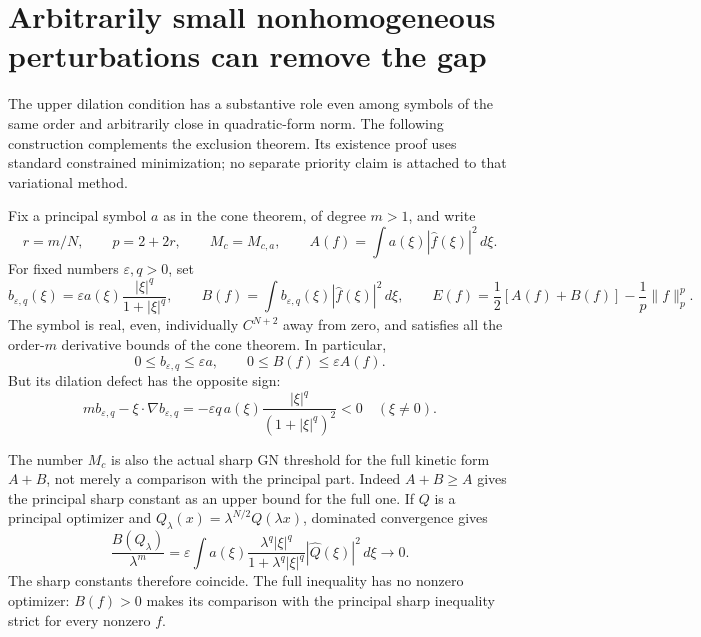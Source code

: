 \section{Arbitrarily small nonhomogeneous perturbations can remove the gap}
\label{sec:r9-bounded-boundary}

The upper dilation condition has a substantive role even among symbols
of the same order and arbitrarily close in quadratic-form norm. The
following construction complements the exclusion theorem. Its existence
proof uses standard constrained minimization; no separate priority claim
is attached to that variational method.

Fix a principal symbol $a$ as in the cone theorem, of degree $m>1$,
and write
\[
 r=m/N,\qquad p=2+2r,\qquad M_c=M_{c,a},\qquad
 A(f)=\int a(\xi)|\widehat f(\xi)|^2\,d\xi.
\]
For fixed numbers $\varepsilon,q>0$, set
\begin{equation}\label{eq:r9-bounded-symbol}
 b_{\varepsilon,q}(\xi)
 =\varepsilon a(\xi)\frac{|\xi|^q}{1+|\xi|^q},\qquad
 B(f)=\int b_{\varepsilon,q}(\xi)|\widehat f(\xi)|^2\,d\xi,
 \qquad E(f)=\frac12[A(f)+B(f)]-\frac1p\|f\|_p^p.
\end{equation}
The symbol is real, even, individually $C^{N+2}$ away from zero, and
satisfies all the order-$m$ derivative bounds of the cone theorem. In
particular,
\begin{equation}\label{eq:r9-bounded-formsmall}
 0\le b_{\varepsilon,q}\le\varepsilon a,
 \qquad 0\le B(f)\le\varepsilon A(f).
\end{equation}
But its dilation defect has the opposite sign:
\begin{equation}\label{eq:r9-bounded-defect}
 mb_{\varepsilon,q}-\xi\cdot\nabla b_{\varepsilon,q}
 =-\varepsilon q\,a(\xi)
       \frac{|\xi|^q}{(1+|\xi|^q)^2}<0\quad(\xi\ne0).
\end{equation}

The number $M_c$ is also the actual sharp GN threshold for the full
kinetic form $A+B$, not merely a comparison with the principal part.
Indeed $A+B\ge A$ gives the principal sharp constant as an upper
bound for the full one. If $Q$ is a principal optimizer and
$Q_\lambda(x)=\lambda^{N/2}Q(\lambda x)$, dominated convergence gives
\[
 \frac{B(Q_\lambda)}{\lambda^m}
 =\varepsilon\int a(\xi)
 \frac{\lambda^q|\xi|^q}{1+\lambda^q|\xi|^q}
 |\widehat Q(\xi)|^2\,d\xi\longrightarrow0.
\]
The sharp constants therefore coincide. The full inequality has no
nonzero optimizer: $B(f)>0$ makes its comparison with the principal
sharp inequality strict for every nonzero $f$.

